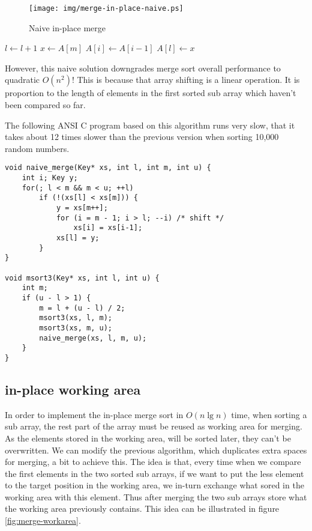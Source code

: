 \documentclass[UTF8]{article}
\begin{document}
\begin{figure}[htbp]
 \centering
 \texttt{[image: img/merge-in-place-naive.ps]}
 \caption{Naive in-place merge}
 \label{fig:merge-in-place-naive}
\end{figure}

\begin{algorithmic}[1]
      \State $l \gets l + 1$
    \Else
      \State $x \gets A[m]$
       
        \State $A[i] \gets A[i-1]$
      \EndFor
      \State $A[l] \gets x$
    \EndIf
  \EndWhile
\EndProcedure
\end{algorithmic}

However, this naive solution downgrades merge sort overall performance to quadratic $O(n^2)$! This is because
that array shifting is a linear operation. It is proportion to the length of elements in
the first sorted sub array which haven't been compared so far.

The following ANSI C program based on this algorithm runs very slow, that it takes about 12 times slower than
the previous version when sorting 10,000 random numbers.

\lstset{language=C}
\begin{lstlisting}
void naive_merge(Key* xs, int l, int m, int u) {
    int i; Key y;
    for(; l < m && m < u; ++l)
        if (!(xs[l] < xs[m])) {
            y = xs[m++];
            for (i = m - 1; i > l; --i) /* shift */
                xs[i] = xs[i-1];
            xs[l] = y;
        }
}

void msort3(Key* xs, int l, int u) {
    int m;
    if (u - l > 1) {
        m = l + (u - l) / 2;
        msort3(xs, l, m);
        msort3(xs, m, u);
        naive_merge(xs, l, m, u);
    }
}
\end{lstlisting}

\subsection{in-place working area}
In order to implement the in-place merge sort in $O(n \lg n)$ time, when sorting a sub array, the rest part of
the array must be reused as working area for merging. As the elements stored in the working area, will be sorted
later, they can't be overwritten. We can modify the previous algorithm, which duplicates extra spaces for merging,
a bit to achieve this. The idea is that, every time when we compare the first elements in the two sorted sub
arrays, if we want to put the less element to the target position in the working area, we in-turn exchange what
sored in the working area with this element. Thus after merging the two sub arrays store what the working area
previously contains. This idea can be illustrated in figure \ref{fig:merge-workarea}.
\end{document}
